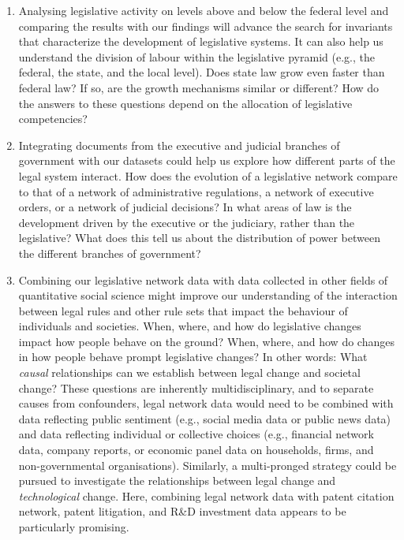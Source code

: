 \begin{enumerate}
	\item Analysing legislative activity on levels above and below the federal level
	and comparing the results with our findings will advance the search for invariants that characterize the development of legislative systems. 
	It can also help us understand the division of labour within the legislative pyramid (e.g., the federal, the state, and the local level).
	Does state law grow even faster than federal law? 
	If so, are the growth mechanisms similar or different? 
	How do the answers to these questions depend on the allocation of legislative competencies?
	
	\item Integrating documents from the executive and judicial branches of government with our datasets could help us explore how different parts of the legal system interact. 
	How does the evolution of a legislative network compare to that of a network of administrative regulations, a network of executive orders, or a network of judicial decisions? 
	In what areas of law is the development driven by the executive or the judiciary, rather than the legislative?
	What does this tell us about the distribution of power between the different branches of government?
	
	\item Combining our legislative network data 
	with data collected in other fields of quantitative social science 
	might improve our understanding of the interaction between legal rules and other rule sets that impact the behaviour of individuals and societies.
	When, where, and how do legislative changes impact how people behave on the ground? 
	When, where, and how do changes in how people behave prompt legislative changes? 
	In other words: What \emph{causal} relationships can we establish between legal change and societal change? 
	These questions are inherently multidisciplinary, 
	and to separate causes from confounders, 
	legal network data would need to be combined with data reflecting public sentiment (e.g., social media data or public news data) and data reflecting individual or collective choices (e.g., 
	financial network data, company reports, or economic panel data on households, firms, and non-governmental organisations). 
	Similarly, a multi-pronged strategy could be pursued to investigate the relationships between legal change and \emph{technological} change. 
	Here, combining legal network data with patent citation network, patent litigation, and R\&D investment data appears to be particularly promising.
\end{enumerate}

